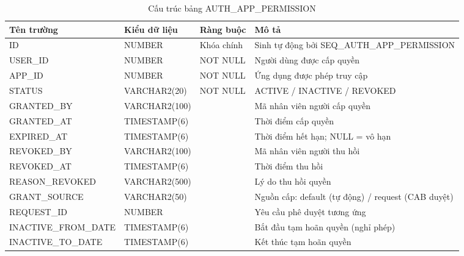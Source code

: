 \documentclass[../DoAn.tex]{subfiles}
\begin{document}
\begin{table}[H]
\centering
\caption{Cấu trúc bảng AUTH\_APP\_PERMISSION}
\label{tab:auth-app-permission}
\footnotesize
\begin{tabular}{|p{3.0cm}|p{2.3cm}|p{2.7cm}|p{4.5cm}|}
\hline
\textbf{Tên trường} & \textbf{Kiểu dữ liệu} & \textbf{Ràng buộc} & \textbf{Mô tả} \\ \hline
ID & NUMBER & Khóa chính & Sinh tự động bởi SEQ\_AUTH\_APP\_PERMISSION \\ \hline
USER\_ID & NUMBER & NOT NULL & Người dùng được cấp quyền \\ \hline
APP\_ID & NUMBER & NOT NULL & Ứng dụng được phép truy cập \\ \hline
STATUS & VARCHAR2(20) & NOT NULL & ACTIVE / INACTIVE / REVOKED \\ \hline
GRANTED\_BY & VARCHAR2(100) & & Mã nhân viên người cấp quyền \\ \hline
GRANTED\_AT & TIMESTAMP(6) & & Thời điểm cấp quyền \\ \hline
EXPIRED\_AT & TIMESTAMP(6) & & Thời điểm hết hạn; NULL = vô hạn \\ \hline
REVOKED\_BY & VARCHAR2(100) & & Mã nhân viên người thu hồi \\ \hline
REVOKED\_AT & TIMESTAMP(6) & & Thời điểm thu hồi \\ \hline
REASON\_REVOKED & VARCHAR2(500) & & Lý do thu hồi quyền \\ \hline
GRANT\_SOURCE & VARCHAR2(50) & & Nguồn cấp: default (tự động) / request (CAB duyệt) \\ \hline
REQUEST\_ID & NUMBER & & Yêu cầu phê duyệt tương ứng \\ \hline
INACTIVE\_FROM\_DATE & TIMESTAMP(6) & & Bắt đầu tạm hoãn quyền (nghỉ phép) \\ \hline
INACTIVE\_TO\_DATE & TIMESTAMP(6) & & Kết thúc tạm hoãn quyền \\ \hline
\end{tabular}
\end{table}
\end{document}

